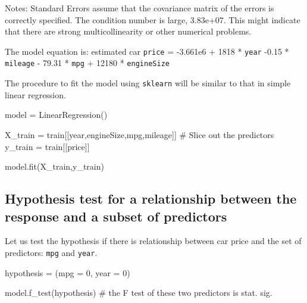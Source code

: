 \documentclass[
  letterpaper,
  DIV=11,
  numbers=noendperiod]{scrreprt}
\newenvironment{Shaded}{\begin{snugshade}}{\end{snugshade}}
\newcommand{\CommentTok}[1]{\textcolor[rgb]{0.37,0.37,0.37}{#1}}
\newcommand{\NormalTok}[1]{\textcolor[rgb]{0.00,0.23,0.31}{#1}}
\newcommand{\OperatorTok}[1]{\textcolor[rgb]{0.37,0.37,0.37}{#1}}
\newcommand{\StringTok}[1]{\textcolor[rgb]{0.13,0.47,0.30}{#1}}
\begin{document}
Notes: \newline
 [1] Standard Errors assume that the covariance matrix of the errors is correctly specified. \newline
 [2] The condition number is large, 3.83e+07. This might indicate that there are \newline
 strong multicollinearity or other numerical problems.

The model equation is: estimated car \texttt{price} = -3.661e6 + 1818 *
\texttt{year} -0.15 * \texttt{mileage} - 79.31 * \texttt{mpg} + 12180 *
\texttt{engineSize}

The procedure to fit the model using \texttt{sklearn} will be similar to
that in simple linear regression.

\begin{Shaded}
\begin{Highlighting}[]
\NormalTok{model }\OperatorTok{=}\NormalTok{ LinearRegression()}

\NormalTok{X\_train }\OperatorTok{=}\NormalTok{ train[[}\StringTok{\textquotesingle{}year\textquotesingle{}}\NormalTok{,}\StringTok{\textquotesingle{}engineSize\textquotesingle{}}\NormalTok{,}\StringTok{\textquotesingle{}mpg\textquotesingle{}}\NormalTok{,}\StringTok{\textquotesingle{}mileage\textquotesingle{}}\NormalTok{]] }\CommentTok{\# Slice out the predictors}
\NormalTok{y\_train }\OperatorTok{=}\NormalTok{ train[[}\StringTok{\textquotesingle{}price\textquotesingle{}}\NormalTok{]]}

\NormalTok{model.fit(X\_train,y\_train)}
\end{Highlighting}
\end{Shaded}

\subsection{Hypothesis test for a relationship between the response and
a subset of
predictors}\label{hypothesis-test-for-a-relationship-between-the-response-and-a-subset-of-predictors}

Let us test the hypothesis if there is relationship between car price
and the set of predictors: \texttt{mpg} and \texttt{year}.

\begin{Shaded}
\begin{Highlighting}[]
\NormalTok{hypothesis }\OperatorTok{=} \StringTok{\textquotesingle{}(mpg = 0, year = 0)\textquotesingle{}}     
    
\NormalTok{model.f\_test(hypothesis) }\CommentTok{\# the F test of these two predictors is stat. sig.}
\end{Highlighting}
\end{Shaded}
\end{document}
